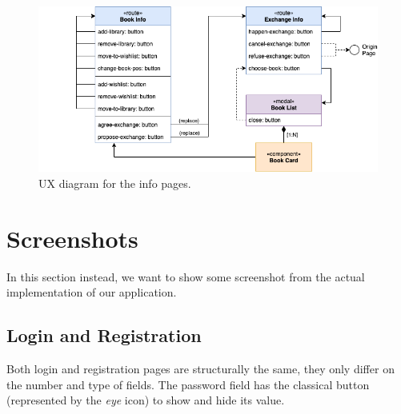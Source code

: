 \begin{figure}[H]
      \includegraphics{ux-diagram/ux-info.png}
      \caption{UX diagram for the info pages.}
      \label{fig:ux-info}
\end{figure}

\clearpage
\section{Screenshots}
In this section instead, we want to show some screenshot from the actual implementation of our application.

\subsection{Login and Registration}
Both login and registration pages are structurally the same, they only differ on the number and type of fields.
The password field has the classical button (represented by the \textit{eye} icon) to show and hide its value.

